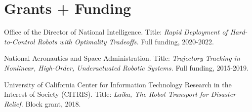 \documentclass[letterpaper]{deedy-resume} %
\begin{document}
{{}
  
{}
{}





\vspace{0.2cm}
\section{Grants + Funding}

\vspace{0.2cm}


\begin{etaremune}[itemsep=0.1cm]

\item {{} Office of the Director of National Intelligence. Title: {\it Rapid Deployment of Hard-to-Control Robots with Optimality Tradeoffs.} Full funding, 2020-2022.}

\item {{} National Aeronautics and Space Administration. Title: {\it Trajectory Tracking in Nonlinear, High-Order, Underactuated Robotic Systems.} Full funding, 2015-2019.}
  
\item {{} University of California Center for Information Technology Research in the Interest of Society (CITRIS). Title: {\it Laika, The Robot Transport for Disaster Relief.}  Block grant, 2018.}


\end{etaremune}}
\end{document}
